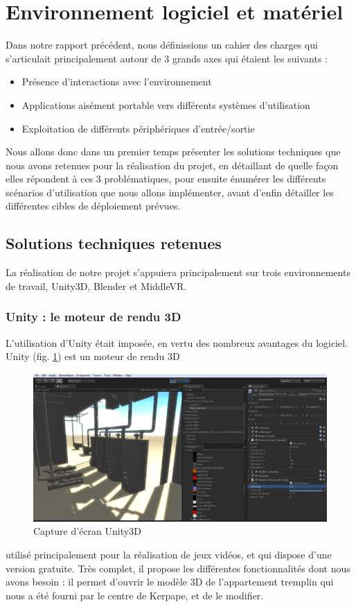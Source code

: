 \section{Environnement logiciel et matériel}

Dans notre rapport précédent, nous définissions un cahier des charges qui s'articulait principalement autour de 3 grands axes qui étaient les suivants : 
\begin{itemize}\renewcommand{\labelitemi}{$\bullet$}
\item Présence d'interactions avec l'environnement
\item Applications aisément portable vers différents systèmes d'utilisation
\item Exploitation de différents périphériques d'entrée/sortie
\end{itemize}
Nous allons donc dans un premier temps présenter les solutions techniques que nous avons retenues pour la réalisation du projet, en détaillant de quelle façon elles répondent à ces 3 problématiques, pour ensuite énumérer les différents scénarios d'utilisation que nous allons implémenter, avant d'enfin détailler les différentes cibles de déploiement prévues. 

\subsection{Solutions techniques retenues}
La réalisation de notre projet s'appuiera principalement sur trois environnements de travail, Unity3D, Blender et MiddleVR.

\subsubsection{Unity : le moteur de rendu 3D}
L'utilisation d'Unity était imposée, en vertu des nombreux avantages du logiciel. Unity (fig. \ref{screen_unity}) est un moteur de rendu 3D
\begin{figure}
	\centering
	\includegraphics[scale=0.5]{2-Specifications/img-utilisateur/screen_unity.jpg}
	\caption{Capture d'écran Unity3D}
	\label{screen_unity}
\end{figure}
utilisé principalement pour la réalisation de jeux vidéos, et qui dispose d'une version gratuite. Très complet, il propose les différentes fonctionnalités dont nous avons besoin : il permet d'ouvrir le modèle 3D de l'appartement tremplin qui nous a été fourni par le centre de Kerpape, et de le modifier. \newline

